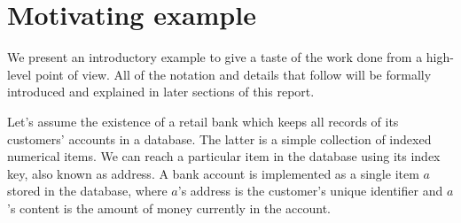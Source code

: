 \section{Motivating example}

We present an introductory example to give a taste of the work done from a high-level point of view. All of the notation and details that follow will be formally introduced and explained in later sections of this report.

Let's assume the existence of a retail bank which keeps all records of its customers' accounts in a database. The latter is a simple collection of indexed numerical items. We can reach a particular item in the database using its index key, also known as address. A bank account is implemented as a single item $a$ stored in the database, where $a$'s address is the customer's unique identifier and $a$'s content is the amount of money currently in the account.


